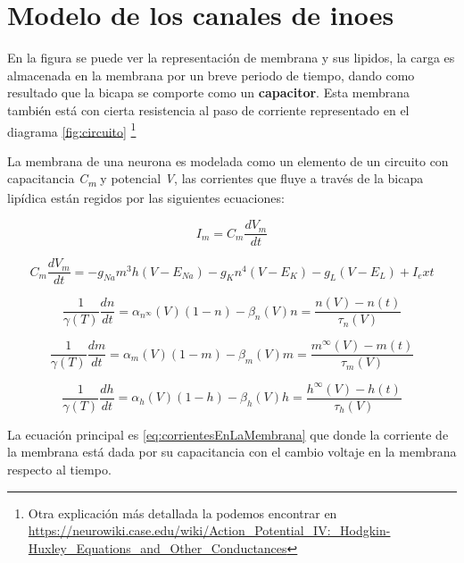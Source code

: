 \section{Modelo de los canales de inoes}

En la figura  se puede ver la representación de membrana y sus lipidos, la carga es almacenada en la membrana por un breve periodo de tiempo, dando como resultado que la bicapa se comporte como un \textbf{capacitor}. Esta membrana también está con cierta resistencia al paso de corriente representado en el diagrama \ref{fig:circuito} \footnote{Otra explicación más detallada la podemos encontrar en \url{https://neurowiki.case.edu/wiki/Action_Potential_IV:_Hodgkin-Huxley_Equations_and_Other_Conductances}} 

La membrana de una neurona es modelada como un elemento de un circuito con capacitancia \emph{C\textsubscript{m}} y potencial \emph{V}, las corrientes que fluye a través de la bicapa lipídica están regidos por las siguientes ecuaciones:

\begin{equation}
  I_{m} = C_{m} \dfrac{dV_{m}}{dt}
  \label{eq:corrientesEnLaMembrana}
\end{equation}


\begin{equation}
  C_{m} \dfrac{dV_{m}}{dt} =  - g_{Na} m^3 h(V - E_{Na} ) - g_{K} n^4 (V - E_{K} ) - g_{L} (V - E_{L} ) + I_ext
  \label{eq:corrientesEnLaMembrana2}
\end{equation}

\begin{equation}
  \dfrac{1}{\gamma(T)}\dfrac{dn}{dt} =  \alpha_{n^\infty} (V)(1 - n) - \beta_{n} (V) n = \dfrac{n(V)-n(t)}{\tau_{n}(V)}
  \label{eq:corrientesEnLaMembrana3}
\end{equation}

\begin{equation}
  \dfrac{1}{\gamma(T)}\dfrac{dm}{dt} =  \alpha_{m} (V)(1 - m) - \beta_{m} (V) m = \dfrac{m^\infty(V)-m(t)}{\tau_{m}(V)}
  \label{eq:corrientesEnLaMembrana4}
\end{equation}

\begin{equation}
  \dfrac{1}{\gamma(T)}\dfrac{dh}{dt} =  \alpha_{h} (V)(1 - h) - \beta_{h} (V) h = \dfrac{h^\infty(V)-h(t)}{\tau_{h}(V)}
  \label{eq:corrientesEnLaMembrana5}
\end{equation}

La ecuación principal es \ref{eq:corrientesEnLaMembrana} que donde la corriente de la membrana está dada por su capacitancia con el cambio voltaje en la membrana respecto al tiempo.

